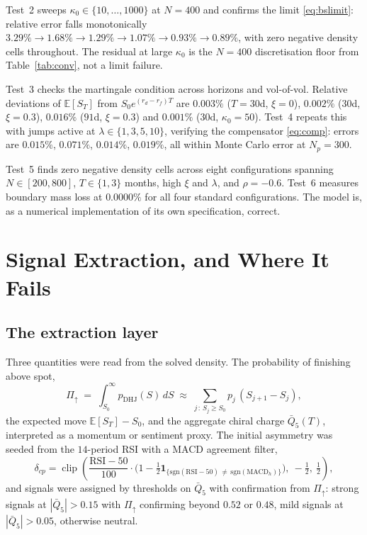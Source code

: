 \documentclass[11pt]{article}
\begin{document}
Test~2 sweeps $\kappa_0 \in \{10, \dots, 1000\}$ at $N=400$ and confirms the
limit \eqref{eq:bslimit}: relative error falls monotonically
$3.29\% \to 1.68\% \to 1.29\% \to 1.07\% \to 0.93\% \to 0.89\%$, with zero
negative density cells throughout. The residual at large $\kappa_0$ is the
$N=400$ discretisation floor from Table~\ref{tab:conv}, not a limit failure.

Test~3 checks the martingale condition across horizons and vol-of-vol.
Relative deviations of $\mathbb{E}[S_T]$ from $S_0 e^{(r_d-r_f)T}$ are
$0.003\%$ ($T=30$d, $\xi=0$), $0.002\%$ ($30$d, $\xi=0.3$), $0.016\%$
($91$d, $\xi=0.3$) and $0.001\%$ ($30$d, $\kappa_0=50$). Test~4 repeats this
with jumps active at $\lambda \in \{1,3,5,10\}$, verifying the compensator
\eqref{eq:comp}: errors are $0.015\%$, $0.071\%$, $0.014\%$, $0.019\%$,
all within Monte Carlo error at $N_p = 300$.

Test~5 finds zero negative density cells across eight configurations
spanning $N \in [200, 800]$, $T \in \{1, 3\}$ months, high $\xi$ and
$\lambda$, and $\rho = -0.6$. Test~6 measures boundary mass loss at
$0.0000\%$ for all four standard configurations. The model is, as a
numerical implementation of its own specification, correct.

\section{Signal Extraction, and Where It Fails}
\label{sec:sig}

\subsection{The extraction layer}

Three quantities were read from the solved density. The probability of
finishing above spot,
\begin{equation}
\Pi_{\uparrow} \;=\; \int_{S_0}^{\infty} p_{\mathrm{DHJ}}(S)\,dS
\;\approx\; \sum_{j\,:\,S_j \ge S_0} p_j\,(S_{j+1} - S_j),
\end{equation}
the expected move $\mathbb{E}[S_T] - S_0$, and the aggregate chiral charge
$\bar{Q}_5(T)$, interpreted as a momentum or sentiment proxy. The initial
asymmetry was seeded from the $14$-period RSI with a MACD agreement filter,
\begin{equation}
\delta_{cp} = \operatorname{clip}\!\left(\frac{\mathrm{RSI} - 50}{100}
  \cdot \big(1 - \tfrac{1}{2}\mathbf{1}_{\{\mathrm{sgn}(\mathrm{RSI}-50)\,\neq\,\mathrm{sgn}(\mathrm{MACD}_h)\}}\big),
  \ -\tfrac{1}{2},\ \tfrac{1}{2}\right),
\label{eq:deltacp}
\end{equation}
and signals were assigned by thresholds on $\bar{Q}_5$ with confirmation
from $\Pi_\uparrow$: strong signals at $|\bar{Q}_5| > 0.15$ with
$\Pi_\uparrow$ confirming beyond $0.52$ or $0.48$, mild signals at
$|\bar{Q}_5| > 0.05$, otherwise neutral.
\end{document}
